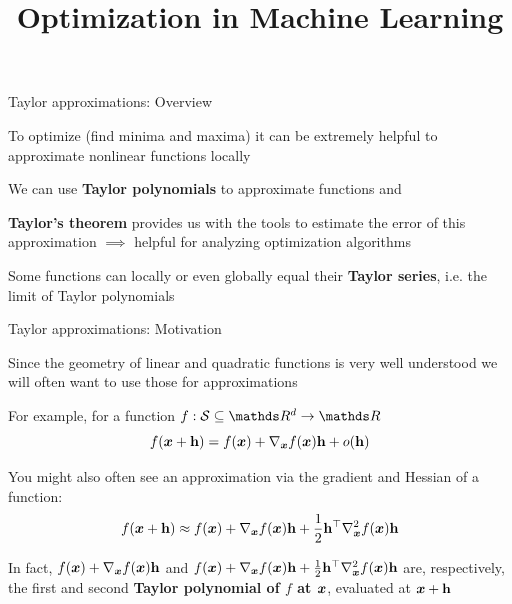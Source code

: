 \documentclass[11pt,compress,t,notes=noshow, xcolor=table]{beamer}
\title{Optimization in Machine Learning}
\begin{document}

\begin{framei}{Taylor approximations: Overview}
\item To optimize (find minima and maxima) it can be extremely helpful to approximate nonlinear functions locally 
\item We can use \textbf{Taylor polynomials} to approximate functions and
\item \textbf{Taylor's theorem} provides us with the tools to estimate the error of this approximation $\implies$ helpful for analyzing optimization algorithms
\item Some functions can locally or even globally equal their \textbf{Taylor series}, i.e. the limit of Taylor polynomials
{}
\end{framei}


\begin{framei}{Taylor approximations: Motivation}
\item Since the geometry of linear and quadratic functions is very well understood we will often want to use those for approximations
\item For example, for a function $f: \mathcal{S}\subseteq \R^d \to \R$
$$
f(\bm{x}+\mathbf{h})=f(\bm{x})+\nabla_{\bm{x}}f(\bm{x}) \mathbf{h}+o(\mathbf{h})
$$
\item You might also often see an approximation via the gradient and Hessian of a function:
$$
f(\bm{x}+\mathbf{h})\approx f(\bm{x})+\nabla_{\bm{x}}f(\bm{x}) \mathbf{h}+\frac{1}{2}\mathbf{h}^\top \nabla^2_{\bm{x}}f(\bm{x}) \mathbf{h}
$$
\item In fact, $f(\bm{x})+\nabla_{\bm{x}}f(\bm{x}) \mathbf{h}$ and $f(\bm{x})+\nabla_{\bm{x}}f(\bm{x}) \mathbf{h}+\frac{1}{2}\mathbf{h}^\top \nabla^2_{\bm{x}}f(\bm{x})\mathbf{h}$ are, respectively, the first and second \textbf{Taylor polynomial of $f$ at $\bm{x}$}, evaluated at $\bm{x}+\mathbf{h}$
\end{framei}
\end{document}
